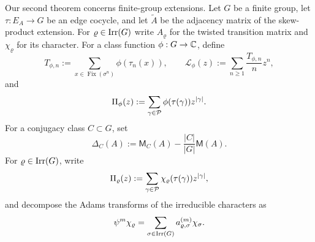 Our second theorem concerns finite-group extensions. Let \(G\) be a
finite group, let \(\tau:E_A\to G\) be an edge cocycle, and let
\(\widetilde A\) be the adjacency matrix of the skew-product
extension. For \(\varrho\in\operatorname{Irr}(G)\) write \(A_\varrho\) for the
twisted transition matrix and \(\chi_\varrho\) for its character. For
a class function \(\phi:G\to\mathbb{C}\), define
\[
  T_{\phi,n}:=\sum_{x\in\operatorname{Fix}(\sigma^n)}\phi(\tau_n(x)),
  \qquad
  \mathcal L_\phi(z):=\sum_{n\ge 1}\frac{T_{\phi,n}}{n}z^n,
\]
and
\[
  \Pi_\phi(z):=\sum_{\gamma\in\mathcal P}\phi(\tau(\gamma))z^{|\gamma|}.
\]
For a conjugacy class \(C\subset G\), set
\[
  \Delta_C(A):=\mathsf M_C(A)-\frac{|C|}{|G|}\mathsf M(A).
\]
For \(\varrho\in\operatorname{Irr}(G)\), write
\[
  \Pi_\varrho(z):=\sum_{\gamma\in\mathcal P}\chi_\varrho(\tau(\gamma))z^{|\gamma|},
\]
and decompose the Adams transforms of the irreducible characters as
\[
  \psi^m\chi_\varrho=\sum_{\sigma\in\operatorname{Irr}(G)}a_{\varrho,\sigma}^{(m)}\chi_\sigma.
\]

